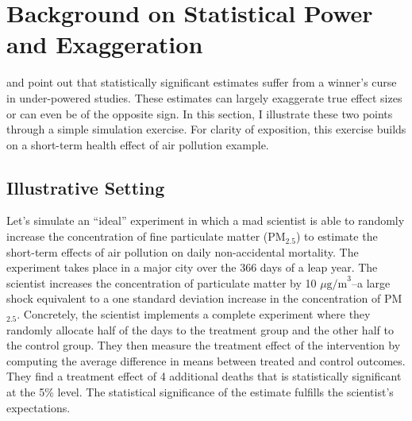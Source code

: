 \documentclass[12pt]{article}
\begin{document}



\section{Background on Statistical Power and Exaggeration}\label{section_mad_scientist}

    \cite{gelman_type_2000} and \cite{gelman_beyond_2014} point out that statistically significant estimates suffer from a winner's curse in under-powered studies. These estimates can largely exaggerate true effect sizes or can even be of the opposite sign. In this section, I illustrate these two points through a simple simulation exercise. For clarity of exposition, this exercise builds on a short-term health effect of air pollution example.%

    \subsection{Illustrative Setting}

    Let's simulate an ``ideal'' experiment in which a mad scientist is able to randomly increase the concentration of fine particulate matter (PM$_{2.5}$) to estimate the short-term effects of air pollution on daily non-accidental mortality. The experiment takes place in a major city over the 366 days of a leap year. The scientist increases the concentration of particulate matter by 10 $\mu \text{g/m}^3$--a large shock equivalent to a one standard deviation increase in the concentration of PM$_{2.5}$. Concretely, the scientist implements a complete experiment where they randomly allocate half of the days to the treatment group and the other half to the control group. They then measure the treatment effect of the intervention by computing the average difference in means between treated and control outcomes. They find a treatment effect of 4 additional deaths that is statistically significant at the 5\% level. The statistical significance of the estimate fulfills the scientist's expectations.
\end{document}
